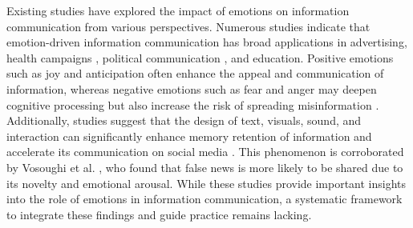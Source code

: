 Existing studies have explored the impact of emotions on information communication from various perspectives. Numerous studies indicate that emotion-driven information communication has broad applications in advertising\cite{bigne2023influence}, health campaigns \cite{montijn2021forgetting, kok2013positive}, political communication \cite{schreiner2021impact, de2021sadness, dabbous2023influence}, and education\cite{plass2014emotional}. Positive emotions such as joy and anticipation often enhance the appeal and communication of information, whereas negative emotions such as fear and anger may deepen cognitive processing but also increase the risk of spreading misinformation \cite{megalakaki2019effects, arfe2023effects}. Additionally, studies suggest that the design of text, visuals, sound, and interaction can significantly enhance memory retention of information and accelerate its communication on social media \cite{schreiner2021impact, dabbous2023influence}. This phenomenon is corroborated by Vosoughi et al. \cite{vosoughi2018spread}, who found that false news is more likely to be shared due to its novelty and emotional arousal. While these studies provide important insights into the role of emotions in information communication, a systematic framework to integrate these findings and guide practice remains lacking.


